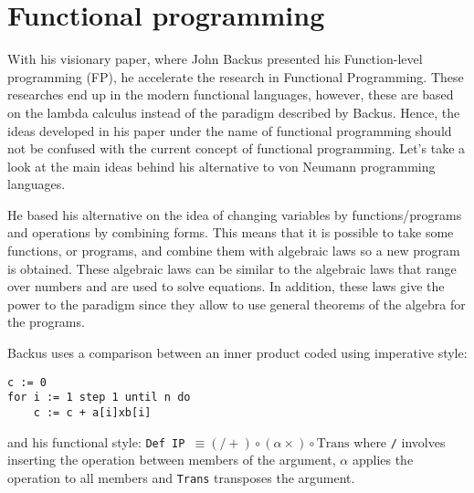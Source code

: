  
 
    \section{Functional programming} \label{sec:fpro}

With his visionary paper, where John Backus presented his Function-level programming (FP), he accelerate the research in Functional Programming.
These researches end up in the modern functional languages, however, these are based on the lambda calculus instead of the paradigm described by Backus. 
Hence, the ideas developed in his paper under the name of functional programming should not be confused with the current concept of functional programming. 
Let's take a look at the main ideas behind his alternative to von Neumann programming languages. 

He based his alternative on the idea of changing variables by functions/programs and operations by combining forms. 
This means that it is possible to take some functions, or programs, and combine them with algebraic laws so a new program is obtained.
These algebraic laws can be similar to the algebraic laws that range over numbers and are used to solve equations.
In addition, these laws give the power to the paradigm since they allow to use general theorems of the algebra for the programs. 

Backus uses a comparison between an inner product coded using imperative style: 
\begin{verbatim}
c := 0
for i := 1 step 1 until n do
    c := c + a[i]xb[i]
\end{verbatim}
and his functional style:
\newline\newline
\texttt{Def IP $\equiv (/+)\circ(\alpha \times)\circ \textrm{Trans}$} 
\newline\newline
where \texttt{/} involves inserting the operation between members of the argument, 
\texttt{$\alpha$} applies the operation to all members and
\texttt{Trans} transposes the argument.


